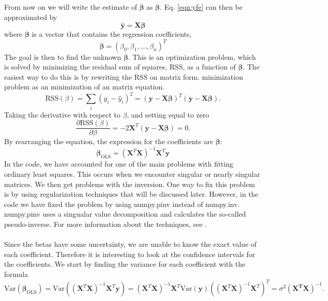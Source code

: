 From now on we will write the estimate of $\boldsymbol{\beta}$ as $\boldsymbol{\beta}.$ Eq. \ref{eqn:yfe} can then be approximated by 
\begin{equation}
    \boldsymbol{\hat{y}} = \boldsymbol{X\beta} 
\end{equation}
where $\boldsymbol{\beta}$ is a vector that contains the regression coefficients,
\begin{equation}
    \boldsymbol{\beta} = (\beta_0, \beta_1, ..., \beta_n)^T
\end{equation}
The goal is then to find the unknown $\boldsymbol{\beta}$. This is an optimization problem, which is solved by minimizing the residual sum of squares, RSS, as a function of $\boldsymbol{\beta}$. The easiest way to do this is by rewriting the RSS on matrix form.  minimization problem as an minimization of an matrix equation.  
\begin{equation}
    \text{RSS}(\beta) = \sum_i(y_i - \hat{y}_i)^2 = (\boldsymbol{y - X\beta})^T(\boldsymbol{y - X\beta}).
\end{equation}
Taking the derivative with respect to $\beta$, and setting equal to zero
\begin{equation}
    \frac{\partial\text{RSS}(\beta)}{\partial \beta} = -2\boldsymbol{X}^T(\boldsymbol{y - X\beta}) = 0.
\end{equation}
By rearranging the equation, the expression for the coefficients are $\boldsymbol{\beta}$:
\begin{equation}
    \boldsymbol{\beta}_{\text{OLS}} = (\boldsymbol{X}^T\boldsymbol{X})^{-1}\boldsymbol{X}^T\boldsymbol{y}
\end{equation}
In the code, we have accounted for one of the main problems with fitting ordinary least squares. This occurs when we encounter singular or nearly singular matrices. We then get problems with the inversion. One way to fix this problem is by using regularization techniques that will be discussed later.  However, in the code we have fixed the problem by using numpy.pinv instead of numpy.inv. numpy.pinv uses a singualar value decomposition and calculates the so-called pseudo-inverse. For more information about the techniques, see \cite{hastie}.
\\
\\
Since the betas have some uncertainty, we are unable to know the exact value of each coefficient. Therefore it is interesting to look at the confidence intervals for the coefficients.  We start by finding the variance for each coefficient with the formula
\begin{equation}
    \text{Var}(\boldsymbol{\beta}_{\text{OLS}}) = \text{Var}((\boldsymbol{X}^T\boldsymbol{X})^{-1}\boldsymbol{X}^T\boldsymbol{y}) = (\boldsymbol{X}^T\boldsymbol{X})^{-1}\boldsymbol{X}^T\text{Var}(\boldsymbol{y})((\boldsymbol{X}^T\boldsymbol{X})^{-1}\boldsymbol{X}^T)^T = \sigma^2 (\boldsymbol{X^TX})^{-1}.
\end{equation}
